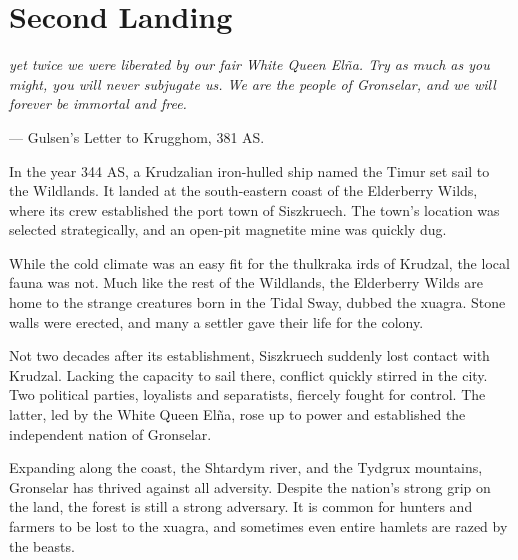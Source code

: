 
\section{Second Landing}

\textit{yet twice we were liberated by our fair White Queen El\~na.
Try as much as you might, you will never subjugate us.
We are the people of Gronselar, and we will forever be immortal and free.}

\hspace*{\fill} --- Gulsen's Letter to Krugghom, 381 AS.

In the year 344 AS, a Krudzalian iron-hulled ship named the Timur set sail to the Wildlands.
It landed at the south-eastern coast of the Elderberry Wilds, where its crew established the port town of Siszkruech.
The town's location was selected strategically, and an open-pit magnetite mine was quickly dug.

While the cold climate was an easy fit for the thulkraka irds of Krudzal, the local fauna was not.
Much like the rest of the Wildlands, the Elderberry Wilds are home to the strange creatures born in the Tidal Sway, dubbed the xuagra.
Stone walls were erected, and many a settler gave their life for the colony.

Not two decades after its establishment, Siszkruech suddenly lost contact with Krudzal.
Lacking the capacity to sail there, conflict quickly stirred in the city.
Two political parties, loyalists and separatists, fiercely fought for control.
The latter, led by the White Queen El\~na, rose up to power and established the independent nation of Gronselar.

Expanding along the coast, the Shtardym river, and the Tydgrux mountains, Gronselar has thrived against all adversity.
Despite the nation's strong grip on the land, the forest is still a strong adversary.
It is common for hunters and farmers to be lost to the xuagra, and sometimes even entire hamlets are razed by the beasts.



